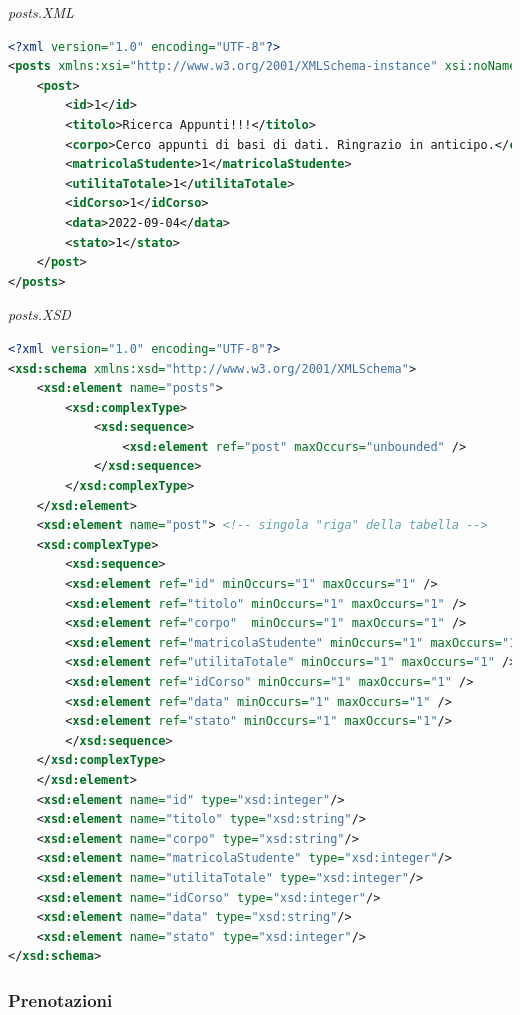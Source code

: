 \documentclass [a4paper,11pt]{book}
\begin{document}
\medskip

\emph{posts.XML}

\label{sec:posts}

\begin{lstlisting}[language=XML]
<?xml version="1.0" encoding="UTF-8"?>
<posts xmlns:xsi="http://www.w3.org/2001/XMLSchema-instance" xsi:noNamespaceSchemaLocation="posts.xsd">
    <post>
        <id>1</id>
        <titolo>Ricerca Appunti!!!</titolo>
        <corpo>Cerco appunti di basi di dati. Ringrazio in anticipo.</corpo>
        <matricolaStudente>1</matricolaStudente>
        <utilitaTotale>1</utilitaTotale>
        <idCorso>1</idCorso>
        <data>2022-09-04</data>
        <stato>1</stato>
    </post>
</posts>
\end{lstlisting}

\emph{posts.XSD}

\begin{lstlisting}[language=XML]
<?xml version="1.0" encoding="UTF-8"?>
<xsd:schema xmlns:xsd="http://www.w3.org/2001/XMLSchema">
    <xsd:element name="posts">
        <xsd:complexType>
            <xsd:sequence>
                <xsd:element ref="post" maxOccurs="unbounded" />
            </xsd:sequence>
        </xsd:complexType>
    </xsd:element>
    <xsd:element name="post"> <!-- singola "riga" della tabella -->
    <xsd:complexType>
        <xsd:sequence>
        <xsd:element ref="id" minOccurs="1" maxOccurs="1" />
        <xsd:element ref="titolo" minOccurs="1" maxOccurs="1" />
        <xsd:element ref="corpo"  minOccurs="1" maxOccurs="1" />
        <xsd:element ref="matricolaStudente" minOccurs="1" maxOccurs="1" />
        <xsd:element ref="utilitaTotale" minOccurs="1" maxOccurs="1" />
        <xsd:element ref="idCorso" minOccurs="1" maxOccurs="1" />
        <xsd:element ref="data" minOccurs="1" maxOccurs="1" />
        <xsd:element ref="stato" minOccurs="1" maxOccurs="1"/>
        </xsd:sequence>   
    </xsd:complexType>
    </xsd:element>
    <xsd:element name="id" type="xsd:integer"/>
    <xsd:element name="titolo" type="xsd:string"/>
    <xsd:element name="corpo" type="xsd:string"/>
    <xsd:element name="matricolaStudente" type="xsd:integer"/>
    <xsd:element name="utilitaTotale" type="xsd:integer"/>
    <xsd:element name="idCorso" type="xsd:integer"/>
    <xsd:element name="data" type="xsd:string"/>
    <xsd:element name="stato" type="xsd:integer"/>
</xsd:schema>
\end{lstlisting}

\medskip

\subsubsection{Prenotazioni}
\end{document}
